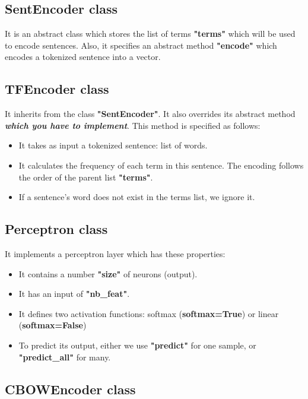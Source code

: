 \documentclass[11pt, a4paper]{article}
\begin{document}
\subsection{SentEncoder class}

It is an abstract class which stores the list of terms \textbf{"terms"} which will be used to encode sentences.
Also, it specifies an abstract method \textbf{"encode"} which encodes a tokenized sentence into a vector.


\subsection{TFEncoder class}

It inherits from the class \textbf{"SentEncoder"}. 
It also overrides its abstract method \textbf{\textit{\color{red}which you have to implement}}.
This method is specified as follows:
\begin{itemize}
	\item It takes as input a tokenized sentence: list of words.
	\item It calculates the frequency of each term in this sentence. The encoding follows the order of the parent list \textbf{"terms"}.
	\item If a sentence's word does not exist in the terms list, we ignore it.
\end{itemize}

\subsection{Perceptron class}

It implements a perceptron layer which has these properties:
\begin{itemize}
	\item It contains a number \textbf{"size"} of neurons (output).
	\item It has an input of \textbf{"nb\_feat"}.
	\item It defines two activation functions: softmax (\textbf{softmax=True}) or linear (\textbf{softmax=False})
	\item To predict its output, either we use \textbf{"predict"} for one sample, or \textbf{"predict\_all"} for many.
\end{itemize}

\subsection{CBOWEncoder class}
\end{document}
